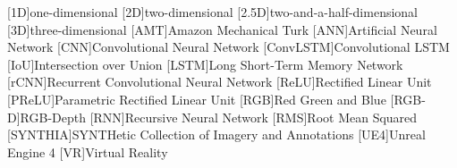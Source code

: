 \begin{acronym}
	[1D]{one-dimensional}
	[2D]{two-dimensional}
	[2.5D]{two-and-a-half-dimensional}
	[3D]{three-dimensional}
	[AMT]{Amazon Mechanical Turk}
	[ANN]{Artificial Neural Network}
	[CNN]{Convolutional Neural Network}
    [ConvLSTM]{Convolutional LSTM}
    [IoU]{Intersection over Union}
    [LSTM]{Long Short-Term Memory Network}
    [rCNN]{Recurrent Convolutional Neural Network}
	[ReLU]{Rectified Linear Unit}
    [PReLU]{Parametric Rectified Linear Unit}
	[RGB]{Red Green and Blue}
    [RGB-D]{RGB-Depth}
	[RNN]{Recursive Neural Network}
    [RMS]{Root Mean Squared}
    [SYNTHIA]{SYNTHetic Collection of Imagery and Annotations}
    [UE4]{Unreal Engine 4}
    [VR]{Virtual Reality}
\end{acronym}
